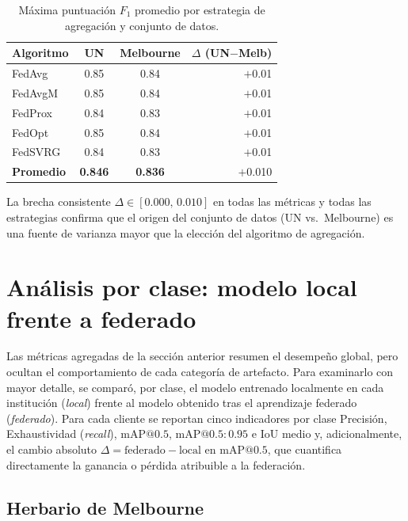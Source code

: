 \begin{table}[H]
  \centering
  \caption{Máxima puntuación $F_1$ promedio por estrategia de agregación y conjunto de datos.}
  \small
  \begin{tabular}{lccr}
    \toprule
    \textbf{Algoritmo} & \textbf{UN} & \textbf{Melbourne} & $\Delta$ \textbf{(UN$-$Melb)} \\
    \midrule
    FedAvg  & 0.85 & 0.84 & $+$0.01 \\
    FedAvgM & 0.85 & 0.84 & $+$0.01 \\
    FedProx & 0.84 & 0.83 & $+$0.01 \\
    FedOpt  & 0.85 & 0.84 & $+$0.01 \\
    FedSVRG & 0.84 & 0.83 & $+$0.01 \\
    \midrule
    \textbf{Promedio} & \textbf{0.846} & \textbf{0.836} & $+$0.010 \\
    \bottomrule
  \end{tabular}
\end{table}

La brecha consistente $\Delta \in [0.000,\,0.010]$ en todas las métricas y todas
las estrategias confirma que el origen del conjunto de datos (UN vs.\ Melbourne) es una
fuente de varianza mayor que la elección del algoritmo de agregación.

\section{Análisis por clase: modelo local frente a federado}

Las métricas agregadas de la sección anterior resumen el desempeño global, pero ocultan el
comportamiento de cada categoría de artefacto. Para examinarlo con mayor detalle, se comparó,
por clase, el modelo entrenado localmente en cada institución (\textit{local}) frente al
modelo obtenido tras el aprendizaje federado (\textit{federado}). Para cada cliente se
reportan cinco indicadores por clase Precisión, Exhaustividad (\textit{recall}),
$\mathrm{mAP}@0.5$, $\mathrm{mAP}@0.5{:}0.95$ e IoU medio y, adicionalmente, el cambio
absoluto $\Delta = \text{federado} - \text{local}$ en $\mathrm{mAP}@0.5$, que cuantifica
directamente la ganancia o pérdida atribuible a la federación.

\subsection{Herbario de Melbourne}


